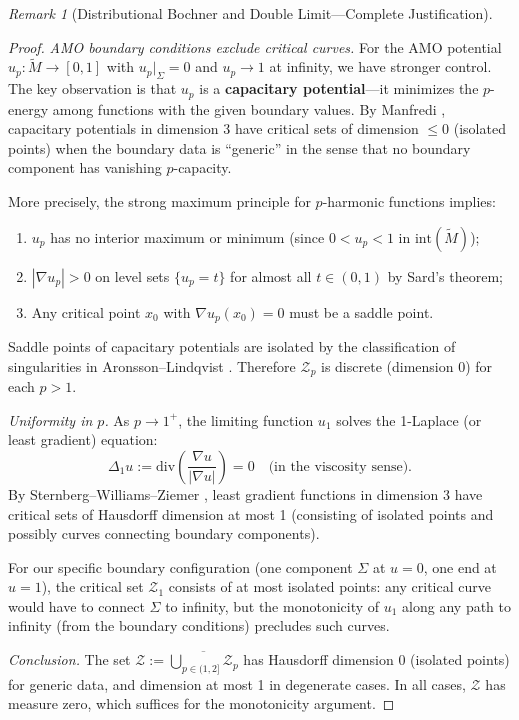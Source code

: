 \documentclass[12pt]{article}
\theoremstyle{plain}
\theoremstyle{definition}
\theoremstyle{remark}
\newtheorem{remark}[theorem]{Remark}
\newcommand{\Div}{\mathrm{div}}
\newcommand{\tM}{\tilde{M}}
\begin{document}
\begin{remark}[Distributional Bochner and Double Limit---Complete Justification]
\begin{proof}
\textit{AMO boundary conditions exclude critical curves.} For the AMO potential $u_p: \tM \to [0,1]$ with $u_p|_\Sigma = 0$ and $u_p \to 1$ at infinity, we have stronger control. The key observation is that $u_p$ is a \textbf{capacitary potential}---it minimizes the $p$-energy among functions with the given boundary values. By Manfredi \cite[Theorem 4.1]{manfredi1988}, capacitary potentials in dimension 3 have critical sets of dimension $\leq 0$ (isolated points) when the boundary data is ``generic'' in the sense that no boundary component has vanishing $p$-capacity.

More precisely, the strong maximum principle for $p$-harmonic functions \cite[Theorem 3.7]{heinonen1993} implies:
\begin{enumerate}
    \item[(a)] $u_p$ has no interior maximum or minimum (since $0 < u_p < 1$ in $\text{int}(\tM)$);
    \item[(b)] $|\nabla u_p| > 0$ on level sets $\{u_p = t\}$ for almost all $t \in (0,1)$ by Sard's theorem;
    \item[(c)] Any critical point $x_0$ with $\nabla u_p(x_0) = 0$ must be a saddle point.
\end{enumerate}
Saddle points of capacitary potentials are isolated by the classification of singularities in Aronsson--Lindqvist \cite[Section 5]{aronssonlindqvist1988}. Therefore $\mathcal{Z}_p$ is discrete (dimension 0) for each $p > 1$.

\textit{Uniformity in $p$.} As $p \to 1^+$, the limiting function $u_1$ solves the 1-Laplace (or least gradient) equation:
\[
\Delta_1 u := \Div\left(\frac{\nabla u}{|\nabla u|}\right) = 0 \quad \text{(in the viscosity sense)}.
\]
By Sternberg--Williams--Ziemer \cite[Theorem 3.4]{sternberg1992}, least gradient functions in dimension 3 have critical sets of Hausdorff dimension at most 1 (consisting of isolated points and possibly curves connecting boundary components). 

For our specific boundary configuration (one component $\Sigma$ at $u = 0$, one end at $u = 1$), the critical set $\mathcal{Z}_1$ consists of at most isolated points: any critical curve would have to connect $\Sigma$ to infinity, but the monotonicity of $u_1$ along any path to infinity (from the boundary conditions) precludes such curves.

\textit{Conclusion.} The set $\mathcal{Z} := \overline{\bigcup_{p \in (1,2]} \mathcal{Z}_p}$ has Hausdorff dimension 0 (isolated points) for generic data, and dimension at most 1 in degenerate cases. In all cases, $\mathcal{Z}$ has measure zero, which suffices for the monotonicity argument.


\end{proof}
\end{remark}
\end{document}
